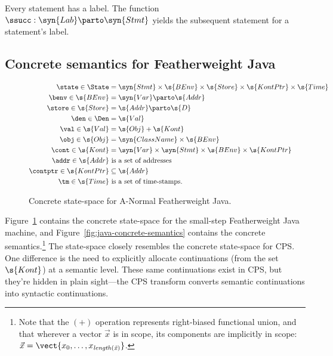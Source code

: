 Every statement has a label.
The function $\ssucc : \syn{Lab} \parto \syn{Stmt}$ yields the
subsequent statement for a statement's label.



\subsection{Concrete semantics for Featherweight Java}

\begin{figure}
\begin{small}
\begin{small}\begin{align*}
  \state \in \State &= 
  \syn{Stmt} \times 
  \s{BEnv} \times 
  \s{Store} \times
  \s{KontPtr} \times
  \s{Time}  
  \\
  \benv \in \s{BEnv} &= \syn{Var} \parto \s{Addr} 
  \\
  \store \in \s{Store} &= \s{Addr} \parto \s{D}
  \\
  \den \in \Den &= \s{Val}
  \\
  \val \in \s{Val} &= \s{Obj} + \s{Kont}
  \\
  \obj \in \s{Obj} &= \syn{ClassName} \times \s{BEnv}
  \\
  \cont \in \s{Kont} &= 
   \syn{Var} \times \syn{Stmt} \times \s{BEnv} \times \s{KontPtr}
  \\
  \addr \in \s{Addr} &\text{ is a set of addresses}
  \\
  \contptr \in \s{KontPtr} &\subseteq \s{Addr}
  \\
  \tm \in \s{Time} &\text{ is a set of time-stamps}  
  \text.  
\end{align*}\end{small}\end{small}\caption{Concrete state-space for A-Normal Featherweight Java.}
\label{fig:java-concrete-state-space}
\end{figure}


Figure~\ref{fig:java-concrete-state-space} contains the concrete
state-space for the small-step Featherweight Java machine, and
Figure~\ref{fig:java-concrete-semantics} contains the concrete
semantics.\footnote{
Note that the $(+)$ operation represents right-biased functional
  union, and that wherever a vector $\vec{x}$ is in scope, its
  components are implicitly in scope: $\vec{x} = \vect{x_0, \ldots,
    x_{\mathit{length(\vec{x})}}}$.  }
The state-space closely resembles the concrete state-space for CPS.
One difference is the need to explicitly allocate continuations (from
the set $\s{Kont}$) at a semantic level.
These same continuations exist in CPS, but they're hidden in plain
sight---the CPS transform converts semantic
continuations into syntactic continuations.





